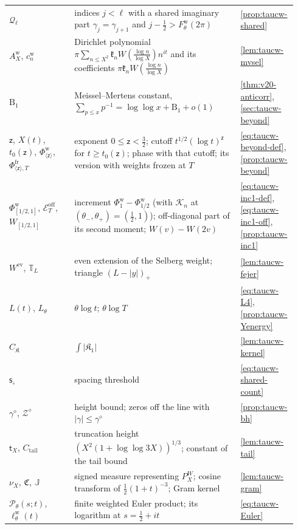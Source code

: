 \documentclass[11pt,a4paper]{article}
\numberwithin{equation}{section}
\theoremstyle{definition}
\theoremstyle{remark}
\begin{document}
\begin{longtable}{@{}p{0.22\linewidth}p{0.56\linewidth}p{0.16\linewidth}@{}}
$\mathcal Q_\ell$ & indices $j<\ell$ with a shared imaginary part $\gamma_j=\gamma_{j+1}$ and $j-\frac12>F^{\mathrm w}_\theta(2\pi)$ & \cref{prop:taucw-shared}\\
$A^{\mathrm w}_X$, $c^{\mathrm w}_n$ & Dirichlet polynomial $\pi\sum_{n\le X^2}\mathfrak k_nW(\frac{\log n}{\log X})n^{it}$ and its coefficients $\pi\mathfrak k_nW(\frac{\log n}{\log X})$ & \cref{lem:taucw-mvsel}\\
$\mathrm B_1$ & Meissel--Mertens constant, $\sum_{p\le x}p^{-1}=\log\log x+\mathrm B_1+o(1)$ & \cref{thm:v20-anticorr}, \cref{sec:taucw-beyond}\\
$\mathsf z$, $X(t)$, $t_0(\mathsf z)$, $\Phi^{\mathrm w}_{\langle\mathsf z\rangle}$, $\Phi^{\mathrm{fr}}_{\langle\mathsf z\rangle,T}$ & exponent $0\le\mathsf z<\frac32$; cutoff $t^{1/2}(\log t)^{\mathsf z}$ for $t\ge t_0(\mathsf z)$; phase with that cutoff; its version with weights frozen at $T$ & \eqref{eq:taucw-beyond-def}, \cref{prop:taucw-beyond}\\
$\Phi^{\mathrm w}_{[1/2,1]}$, $\mathscr E^{\mathrm{off}}_T$, $W_{[1/2,1]}$ & increment $\Phi^{\mathrm w}_1-\Phi^{\mathrm w}_{1/2}$ (with $\mathscr K_n$ at $(\theta_-,\theta_+)=(\frac12,1)$); off-diagonal part of its second moment; $W(v)-W(2v)$ & \eqref{eq:taucw-inc1-def}, \eqref{eq:taucw-inc1-off}, \cref{prop:taucw-inc1}\\
$W^{\mathrm{ev}}$, $\mathbb T_L$ & even extension of the Selberg weight; triangle $(L-|y|)_+$ & \cref{lem:taucw-fejer}\\
$L(t)$, $L_\theta$ & $\theta\log t$; $\theta\log T$ & \eqref{eq:taucw-L4}, \cref{prop:taucw-Yenergy}\\
$C_{\mathfrak K}$ & $\int|\mathfrak K_1|$ & \cref{lem:taucw-kernel}\\
$\mathsf s_\circ$ & spacing threshold & \eqref{eq:taucw-shared-count}\\
$\gamma^\diamond$, $\mathscr Z^\diamond$ & height bound; zeros off the line with $|\gamma|\le\gamma^\diamond$ & \cref{prop:taucw-bh}\\
$\mathsf t_X$, $C_{\mathrm{tail}}$ & truncation height $(X^2(1+\log\log3X))^{1/3}$; constant of the tail bound & \cref{lem:taucw-tail}\\
$\nu_X$, $\mathfrak C$, $\mathbb J$ & signed measure representing $P^W_X$; cosine transform of $\frac12(1+t)^{-3}$; Gram kernel & \cref{lem:taucw-gram}\\
$\mathcal P_\theta(s;t)$, $\ell^{\mathrm w}_\theta(t)$ & finite weighted Euler product; its logarithm at $s=\frac12+it$ & \eqref{eq:taucw-Euler}\\

\end{longtable}
\end{document}
